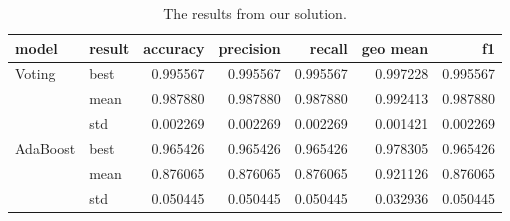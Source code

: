 \begin{table}
    \begin{tabular}{llrrrrr}
        \toprule
        model    & result & accuracy & precision & recall   & geo mean & f1       \\
        \midrule
        Voting   & best   & 0.995567 & 0.995567  & 0.995567 & 0.997228 & 0.995567 \\
                 & mean   & 0.987880 & 0.987880  & 0.987880 & 0.992413 & 0.987880 \\
                 & std    & 0.002269 & 0.002269  & 0.002269 & 0.001421 & 0.002269 \\
        AdaBoost & best   & 0.965426 & 0.965426  & 0.965426 & 0.978305 & 0.965426 \\
                 & mean   & 0.876065 & 0.876065  & 0.876065 & 0.921126 & 0.876065 \\
                 & std    & 0.050445 & 0.050445  & 0.050445 & 0.032936 & 0.050445 \\
        \bottomrule
    \end{tabular}
    \caption{The results from our solution.}
    \label{tab: our result}
\end{table}

